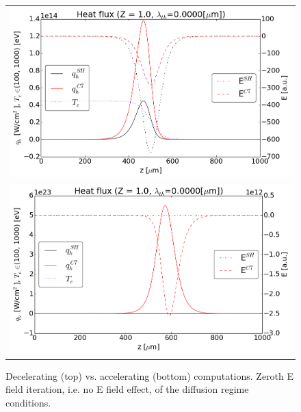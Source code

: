 \documentclass[preprint,12pt]{elsarticle}
\begin{document}
\begin{figure}[tbh]
  \begin{center}
    \begin{tabular}{c}
      \includegraphics[width=1.0\textwidth]{../results/fe_analysis/figs/P5_diffusive_heatflux_Z1_decelerating_Ezerothiter.png} \\
      \includegraphics[width=1.0\textwidth]{../results/fe_analysis/figs/P5_diffusive_heatflux_Z1_accelerating_Ezerothiter.png}
    \end{tabular}
  \caption{
  Decelerating (top) vs. accelerating (bottom) computations. 
  Zeroth E field iteration, i.e.
  no E field effect, of the diffusion regime conditions.
  }
  \end{center}
  \label{fig:}
\end{figure}

\clearpage

\end{document}
